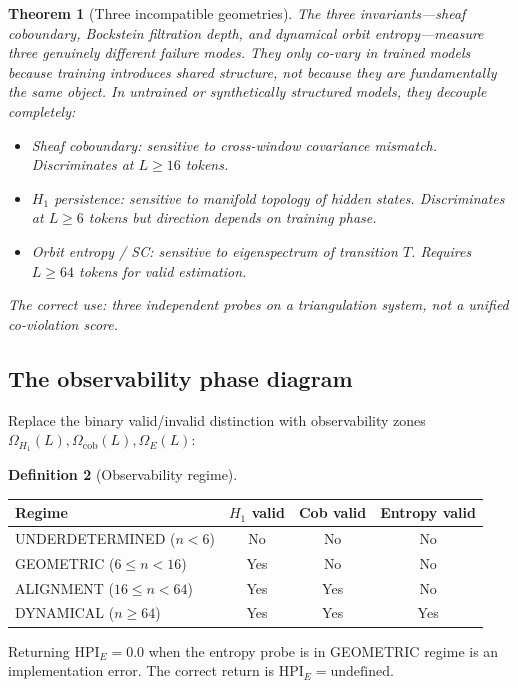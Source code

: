 \documentclass[11pt]{amsart}
\newtheorem{theorem}{Theorem}[section]
\theoremstyle{definition}
\newtheorem{definition}[theorem]{Definition}
\begin{document}
\begin{theorem}[Three incompatible geometries]
\label{thm:three-geom}
The three invariants---sheaf coboundary, Bockstein filtration depth, and
dynamical orbit entropy---measure three genuinely different failure modes.
They only co-vary in trained models because training introduces shared
structure, not because they are fundamentally the same object.
In untrained or synthetically structured models, they decouple completely:
\begin{itemize}
\item Sheaf coboundary: sensitive to cross-window covariance mismatch.
      Discriminates at $L \geq 16$ tokens.
\item $H_1$ persistence: sensitive to manifold topology of hidden states.
      Discriminates at $L \geq 6$ tokens but direction depends on training phase.
\item Orbit entropy / SC: sensitive to eigenspectrum of transition $T$.
      Requires $L \geq 64$ tokens for valid estimation.
\end{itemize}
The correct use: three independent probes on a triangulation system,
not a unified co-violation score.
\end{theorem}

\subsection{The observability phase diagram}

Replace the binary valid/invalid distinction with observability zones
$\Omega_{H_1}(L), \Omega_\mathrm{cob}(L), \Omega_E(L)$:

\begin{definition}[Observability regime]
\begin{center}
\begin{tabular}{lccc}
\toprule
Regime & $H_1$ valid & Cob valid & Entropy valid \\
\midrule
UNDERDETERMINED ($n < 6$) & No & No & No \\
GEOMETRIC ($6 \leq n < 16$) & Yes & No & No \\
ALIGNMENT ($16 \leq n < 64$) & Yes & Yes & No \\
DYNAMICAL ($n \geq 64$) & Yes & Yes & Yes \\
\bottomrule
\end{tabular}
\end{center}
Returning $\mathrm{HPI}_E = 0.0$ when the entropy probe is in GEOMETRIC regime
is an implementation error.
The correct return is $\mathrm{HPI}_E = \mathrm{undefined}$.
\end{definition}
\end{document}
